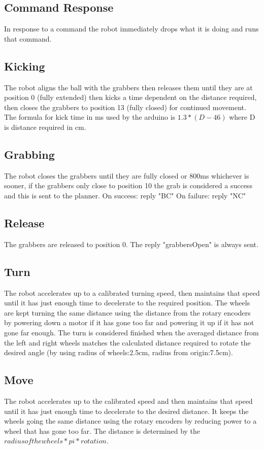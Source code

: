 \documentclass[a4paper]{article}
\begin{document}
\subsection{Command Response}
In response to a command the robot immediately drops what it is doing and runs that command. 
\subsection{Kicking}
The robot aligns the ball with the grabbers then releases them until they are at position 0 (fully extended) then kicks a time dependent on the distance required, then closes the grabbers to position 13 (fully closed) for continued movement. The formula for kick time in ms used by the arduino is $ 1.3*(D-46) $ where D is distance required in cm. 
\subsection{Grabbing}
The robot closes the grabbers until they are fully closed or 800ms whichever is sooner, if the grabbers only close to position 10 the grab is considered a success and this is sent to the planner. 
On success: reply "BC"
On failure: reply "NC"
\subsection{Release}
The grabbers are released to position 0. The reply "grabbersOpen" is always sent. 
\subsection{Turn}
The robot accelerates up to a calibrated turning speed, then maintains that speed until it has just enough time to decelerate to the required position. The wheels are kept turning the same distance using the distance from the rotary encoders by powering down a motor if it has gone too far and powering it up if it has not gone far enough. The turn is considered finished when the averaged distance from the left and right wheels matches the calculated distance required to rotate the desired angle (by using radius of wheels:2.5cm, radius from origin:7.5cm). 
\subsection{Move}
The robot accelerates up to the calibrated speed and then maintains that speed until it has just enough time to decelerate to the desired distance. It keeps the wheels going the same distance using the rotary encoders by reducing power to a wheel that has gone too far. The distance is determined by the $ radius of the wheels * pi * rotation $. 
\end{document}
